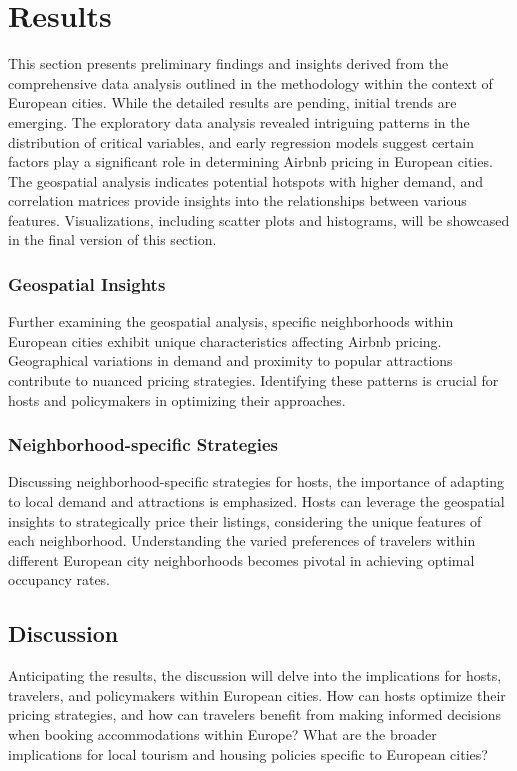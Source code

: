 \documentclass[12pt, letterpaper]{article}
\begin{document}
\section*{Results}
This section presents preliminary findings and insights derived from the comprehensive data analysis outlined in the methodology within the context of European cities. While the detailed results are pending, initial trends are emerging. The exploratory data analysis revealed intriguing patterns in the distribution of critical variables, and early regression models suggest certain factors play a significant role in determining Airbnb pricing in European cities. The geospatial analysis indicates potential hotspots with higher demand, and correlation matrices provide insights into the relationships between various features. Visualizations, including scatter plots and histograms, will be showcased in the final version of this section.

\subsubsection*{Geospatial Insights}
Further examining the geospatial analysis, specific neighborhoods within European cities exhibit unique characteristics affecting Airbnb pricing. Geographical variations in demand and proximity to popular attractions contribute to nuanced pricing strategies. Identifying these patterns is crucial for hosts and policymakers in optimizing their approaches.

\subsubsection*{Neighborhood-specific Strategies}
Discussing neighborhood-specific strategies for hosts, the importance of adapting to local demand and attractions is emphasized. Hosts can leverage the geospatial insights to strategically price their listings, considering the unique features of each neighborhood. Understanding the varied preferences of travelers within different European city neighborhoods becomes pivotal in achieving optimal occupancy rates.

\subsection*{Discussion}
Anticipating the results, the discussion will delve into the implications for hosts, travelers, and policymakers within European cities. How can hosts optimize their pricing strategies, and how can travelers benefit from making informed decisions when booking accommodations within Europe? What are the broader implications for local tourism and housing policies specific to European cities?
\end{document}
